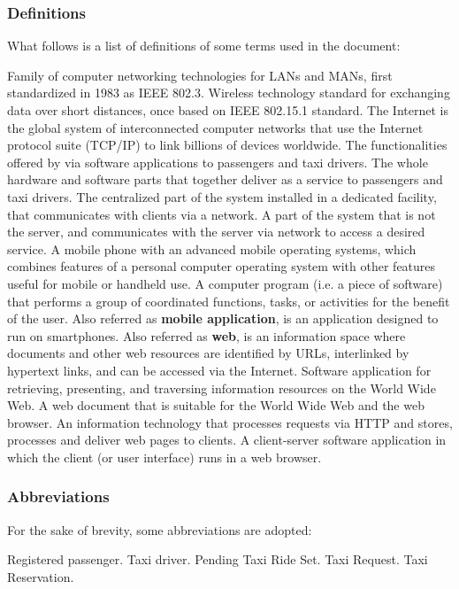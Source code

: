 \subsubsection{Definitions}
What follows is a list of definitions of some terms used in the document:
\begin{itemize}
	 Family of computer networking technologies for LANs and MANs, first standardized in 1983 as IEEE 802.3.
	 Wireless technology standard for exchanging data over short distances, once based on IEEE 802.15.1 standard.
	 The Internet is the global system of interconnected computer networks that use the Internet protocol suite (TCP/IP) to link billions of devices worldwide.
	 The functionalities offered by \myTaxiService{} via software applications to passengers and taxi drivers.
	 The whole hardware and software parts that together deliver \myTaxiService{} as a service to passengers and taxi drivers.
	 The centralized part of the system installed in a dedicated facility, that communicates with clients via a network.
	 A part of the system that is not the server, and communicates with the server via network to access a desired service.
	 A mobile phone with an advanced mobile operating systems, which combines features of a personal computer operating system with other features useful for mobile or handheld use.
	 A computer program (i.e. a piece of software) that performs a group of coordinated functions, tasks, or activities for the benefit of the user.
	 Also referred as \textbf{mobile application}, is an application designed to run on smartphones.
	 Also referred as \textbf{web}, is an information space where documents and other web resources are identified by URLs, interlinked by hypertext links, and can be accessed via the Internet.
	 Software application for retrieving, presenting, and traversing information resources on the World Wide Web.
	 A web document that is suitable for the World Wide Web and the web browser.
	 An information technology that processes requests via HTTP and stores, processes and deliver web pages to clients.
	 A client-server software application in which the client (or user interface) runs in a web browser.
\end{itemize}
\subsubsection{Abbreviations}
For the sake of brevity, some abbreviations are adopted:
\begin{itemize}
	 Registered passenger.
	 Taxi driver.
	 Pending Taxi Ride Set.
	 Taxi Request.
	 Taxi Reservation.
\end{itemize}	
